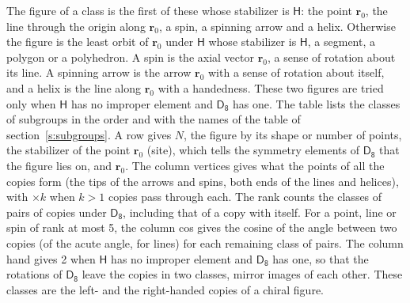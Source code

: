 \documentclass[10pt,a4paper]{article}
\numberwithin{equation}{section}
\newcommand{\grp}[1]{\mathsf{#1}}
\newcommand{\pointr}{\mathbf{r}}
\begin{document}
\leavevmode\label{n:head.figure}The figure of a class is the first of these whose stabilizer is $\grp{H}$: the point $\pointr_0$, the line through the origin along $\pointr_0$, a spin, a spinning arrow and a helix. Otherwise the figure is the least orbit of $\pointr_0$ under $\grp{H}$ whose stabilizer is $\grp{H}$, a segment, a polygon or a polyhedron. A spin is the axial vector $\pointr_0$, a sense of rotation about its line. A spinning arrow is the arrow $\pointr_0$ with a sense of rotation about itself, and a helix is the line along $\pointr_0$ with a handedness. These two figures are tried only when $\grp{H}$ has no improper element and $\grp{D_{8}}$ has one. The table lists the classes of subgroups in the order and with the names of the table of section~\ref{s:subgroups}. \label{n:head.site}A row gives $N$, the figure by its shape or number of points, the stabilizer of the point $\pointr_0$ (site), which tells the symmetry elements of $\grp{D_{8}}$ that the figure lies on, and $\pointr_0$. \label{n:head.vertices}The column vertices gives what the points of all the copies form (the tips of the arrows and spins, both ends of the lines and helices), with ${\times}k$ when $k > 1$ copies pass through each. \label{n:head.rank}The rank counts the classes of pairs of copies under $\grp{D_{8}}$, including that of a copy with itself. \label{n:head.cos}For a point, line or spin of rank at most 5, the column cos gives the cosine of the angle between two copies (of the acute angle, for lines) for each remaining class of pairs. \label{n:head.hand}The column hand gives 2 when $\grp{H}$ has no improper element and $\grp{D_{8}}$ has one, so that the rotations of $\grp{D_{8}}$ leave the copies in two classes, mirror images of each other. These classes are the left- and the right-handed copies of a chiral figure.
\end{document}
